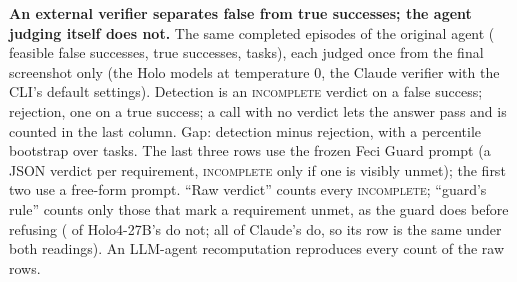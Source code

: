\begin{table}[t]
\centering\small
\resizebox{\linewidth}{!}{}
\caption{\textbf{An external verifier separates false from true successes; the agent judging itself does not.} The same \gbEpisodes{} completed episodes of the original agent (\gbFs{} feasible false successes, \gbTrue{} true successes, \gbTasks{} tasks), each judged once from the final screenshot only (the Holo models at temperature 0, the Claude verifier with the CLI's default settings). Detection is an \textsc{incomplete} verdict on a false success; rejection, one on a true success; a call with no verdict lets the answer pass and is counted in the last column. Gap: detection minus rejection, with a percentile bootstrap over tasks. The last three rows use the frozen Feci Guard prompt (a JSON verdict per requirement, \textsc{incomplete} only if one is visibly unmet); the first two use a free-form prompt. ``Raw verdict'' counts every \textsc{incomplete}; ``guard's rule'' counts only those that mark a requirement unmet, as the guard does before refusing (\gbHolofourruleDropped{} of Holo4-27B's \gbHolofourruleRawInc{} do not; all of Claude's do, so its row is the same under both readings). An LLM-agent recomputation reproduces every count of the raw rows.}
\label{tab:guard}
\end{table}
